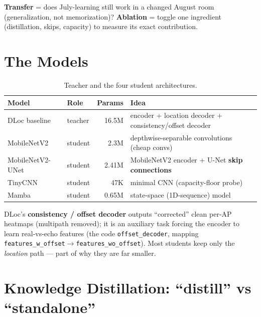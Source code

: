 \documentclass[11pt]{article}
\begin{document}
\begin{keybox}
\textbf{Transfer} = does July-learning still work in a changed August room (generalization, not
memorization)? \quad \textbf{Ablation} = toggle one ingredient (distillation, skips, capacity) to measure
its exact contribution.
\end{keybox}

\section{The Models}

\begin{table}[h]\centering\footnotesize
\begin{tabular}{@{}llrl@{}}
\toprule
\textbf{Model} & \textbf{Role} & \textbf{Params} & \textbf{Idea} \\
\midrule
DLoc baseline    & teacher & 16.5M & encoder + location decoder + consistency/offset decoder \\
MobileNetV2      & student & 2.3M  & depthwise-separable convolutions (cheap convs) \\
MobileNetV2-UNet & student & 2.41M & MobileNetV2 encoder + U-Net \textbf{skip connections} \\
TinyCNN          & student & 47K   & minimal CNN (capacity-floor probe) \\
Mamba            & student & 0.65M & state-space (1D-sequence) model \\
\bottomrule
\end{tabular}
\caption{Teacher and the four student architectures.}
\end{table}

\noindent DLoc's \textbf{consistency / offset decoder} outputs ``corrected'' clean per-AP heatmaps
(multipath removed); it is an auxiliary task forcing the encoder to learn real-vs-echo features (the code
\texttt{offset\_decoder}, mapping \texttt{features\_w\_offset}$\to$\texttt{features\_wo\_offset}). Most
students keep only the \emph{location} path --- part of why they are far smaller.

\section{Knowledge Distillation: ``distill'' vs ``standalone''}
\end{document}
